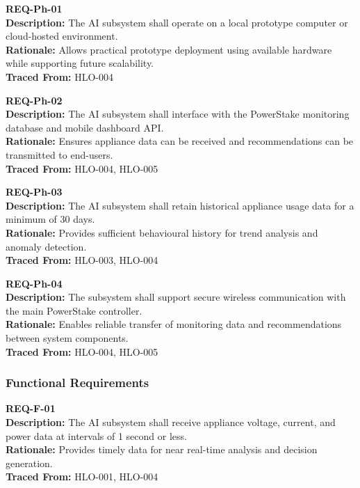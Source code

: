 \documentclass[11pt, twoside, a4paper]{article}
\begin{document}
\textbf{REQ-Ph-01} \\
\textbf{Description:} The AI subsystem shall operate on a local prototype computer or cloud-hosted environment. \\
\textbf{Rationale:} Allows practical prototype deployment using available hardware while supporting future scalability. \\
\textbf{Traced From:} HLO-004

\vspace{0.5em}

\textbf{REQ-Ph-02} \\
\textbf{Description:} The AI subsystem shall interface with the PowerStake monitoring database and mobile dashboard API. \\
\textbf{Rationale:} Ensures appliance data can be received and recommendations can be transmitted to end-users. \\
\textbf{Traced From:} HLO-004, HLO-005

\vspace{0.5em}

\textbf{REQ-Ph-03} \\
\textbf{Description:} The AI subsystem shall retain historical appliance usage data for a minimum of 30 days. \\
\textbf{Rationale:} Provides sufficient behavioural history for trend analysis and anomaly detection. \\
\textbf{Traced From:} HLO-003, HLO-004

\vspace{0.5em}

\textbf{REQ-Ph-04} \\
\textbf{Description:} The subsystem shall support secure wireless communication with the main PowerStake controller. \\
\textbf{Rationale:} Enables reliable transfer of monitoring data and recommendations between system components. \\
\textbf{Traced From:} HLO-004, HLO-005

\vspace{0.5em}

\subsubsection*{Functional Requirements}

\textbf{REQ-F-01} \\
\textbf{Description:} The AI subsystem shall receive appliance voltage, current, and power data at intervals of 1 second or less. \\
\textbf{Rationale:} Provides timely data for near real-time analysis and decision generation. \\
\textbf{Traced From:} HLO-001, HLO-004
\end{document}
